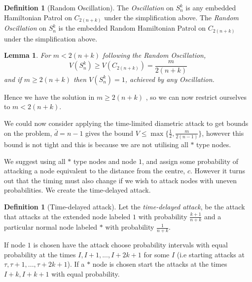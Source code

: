 \documentclass[a4paper,10pt]{article}
\newtheorem{lemma}[theorem]{Lemma}
\theoremstyle{definition}
\newtheorem{definition}[theorem]{Definition}
\theoremstyle{definition}
\theoremstyle{remark}
\theoremstyle{definition}
\begin{document}
\begin{definition}[Random Oscillation]
The \textit{Oscillation} on $S_{n}^{k}$ is any embedded Hamiltonian Patrol on $C_{2(n+k)}$ under the simplification above.
The \textit{Random Oscillation} on $S_{n}^{k}$ is the embedded Random Hamiltonian Patrol on $C_{2(n+k)}$ under the simplification above.
\end{definition}

\begin{lemma}
For $m < 2(n+k)$ following the Random Oscillation,
$$V(S_{n}^{k}) \geq V(C_{2(n+k)})=\frac{m}{2(n+k)}$$
and if $m \geq 2(n+k)$ then $V(S_{n}^{k})=1$, achieved by any Oscillation.
\end{lemma}

Hence we have the solution in $m \geq 2(n+k)$ , so we can now restrict ourselves to $m < 2(n+k)$.

We could now consider applying the time-limited diametric attack to get bounds on the problem, $\bar{d}=n-1$ gives the bound $V \leq \max \{\frac{1}{2} , \frac{m}{2(n-1)}  \}$, however this bound is not tight and this is because we are not utilising all $*$ type nodes.

We suggest using all $*$ type nodes and node $1$, and assign some probability of attacking a node equivalent to the distance from the centre, $c$. However it turns out that the timing must also change if we wish to attack nodes with uneven probabilities. We create the time-delayed attack.

\begin{definition}[Time-delayed attack]
Let the \textit{time-delayed attack}, be the attack that attacks at the extended node labeled $1$ with probability $\frac{k+1}{n+k}$ and a particular normal node labeled $*$ with probability $\frac{1}{n+k}$.

If node $1$ is chosen have the attack choose probability intervals with equal probability at the times $I,I+1,...,I+2k+1$ for some $I$ (i.e starting attacks at $\tau, \tau+1,...,\tau+2k+1$). If a $*$ node is chosen start the attacks at the times $I+k,I+k+1$ with equal probability.
\end{definition}
\end{document}
